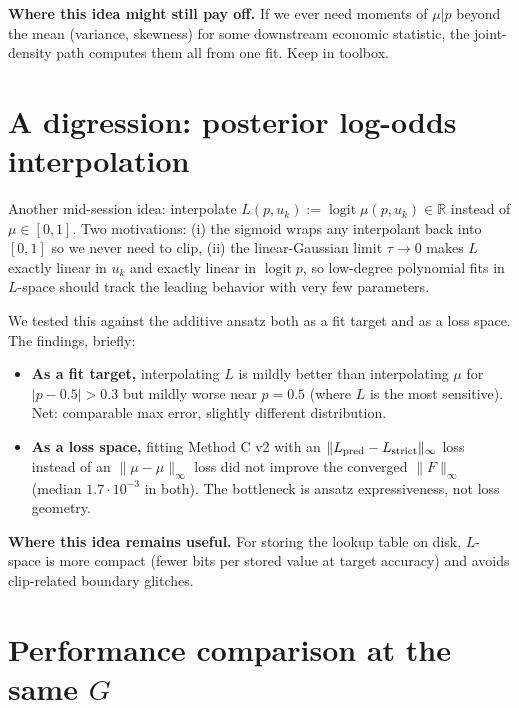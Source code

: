\documentclass[11pt]{article}
\begin{document}
\textbf{Where this idea might still pay off.} If we ever need
moments of $\mu | p$ beyond the mean (variance, skewness) for some
downstream economic statistic, the joint-density path computes them
all from one fit. Keep in toolbox.

\section{A digression: posterior log-odds interpolation}

Another mid-session idea: interpolate $L(p, u_k) := \operatorname{logit}\mu(p, u_k) \in
\mathbb{R}$ instead of $\mu \in [0,1]$. Two motivations: (i) the
sigmoid wraps any interpolant back into $[0,1]$ so we never need to
clip, (ii) the linear-Gaussian limit $\tau \to 0$ makes $L$ exactly
linear in $u_k$ and exactly linear in $\operatorname{logit} p$, so
low-degree polynomial fits in $L$-space should track the leading
behavior with very few parameters.

We tested this against the additive ansatz both as a fit target and
as a loss space. The findings, briefly:

\begin{itemize}\itemsep1pt
  \item \textbf{As a fit target,} interpolating $L$ is mildly better
        than interpolating $\mu$ for $|p - 0.5| > 0.3$ but mildly
        worse near $p = 0.5$ (where $L$ is the most sensitive). Net:
        comparable max error, slightly different distribution.
  \item \textbf{As a loss space,} fitting Method C v2 with an
        $\|L_{\rm pred} - L_{\rm strict}\|_\infty$ loss instead of
        an $\|\mu - \mu\|_\infty$ loss did not improve the converged
        $\|F\|_\infty$ (median $1.7 \cdot 10^{-3}$ in both). The
        bottleneck is ansatz expressiveness, not loss geometry.
\end{itemize}

\textbf{Where this idea remains useful.} For storing the lookup table
on disk, $L$-space is more compact (fewer bits per stored value at
target accuracy) and avoids clip-related boundary glitches.

\section{Performance comparison at the same $G$}
\end{document}
